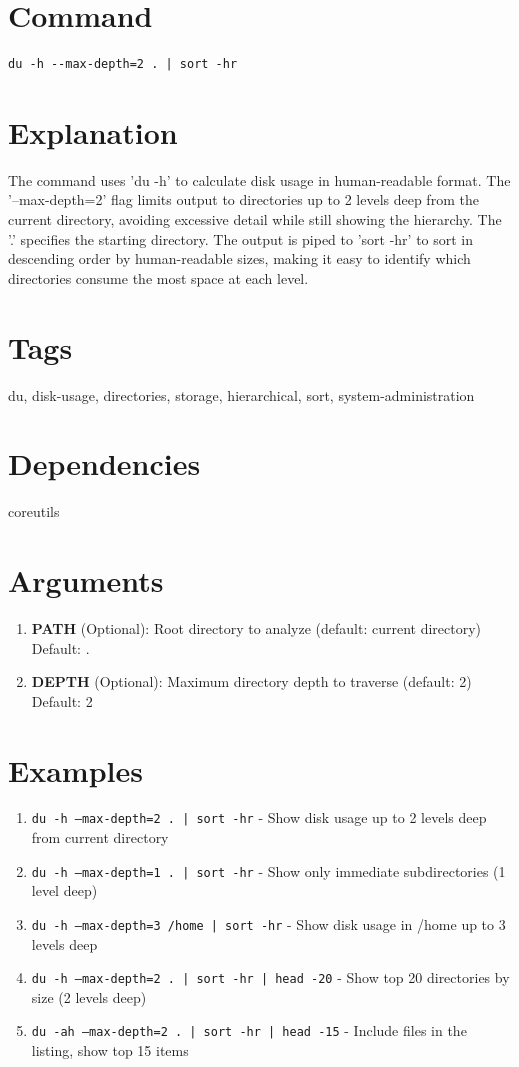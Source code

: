 \documentclass[openany]{book}
\begin{document}
\section*{Command}
\begin{lstlisting}
du -h --max-depth=2 . | sort -hr
\end{lstlisting}

\section*{Explanation}
The command uses 'du -h' to calculate disk usage in human-readable format. The '--max-depth=2' flag limits output to directories up to 2 levels deep from the current directory, avoiding excessive detail while still showing the hierarchy. The '.' specifies the starting directory. The output is piped to 'sort -hr' to sort in descending order by human-readable sizes, making it easy to identify which directories consume the most space at each level.

\section*{Tags}
du, disk-usage, directories, storage, hierarchical, sort, system-administration

\section*{Dependencies}
coreutils


\section*{Arguments}
\begin{enumerate}
  \item \textbf{PATH} (Optional): Root directory to analyze (default: current directory) \\ Default: .
  \item \textbf{DEPTH} (Optional): Maximum directory depth to traverse (default: 2) \\ Default: 2
\end{enumerate}

\section*{Examples}
\begin{enumerate}
  \item \texttt{du -h --max-depth=2 . | sort -hr} - Show disk usage up to 2 levels deep from current directory
  \item \texttt{du -h --max-depth=1 . | sort -hr} - Show only immediate subdirectories (1 level deep)
  \item \texttt{du -h --max-depth=3 /home | sort -hr} - Show disk usage in /home up to 3 levels deep
  \item \texttt{du -h --max-depth=2 . | sort -hr | head -20} - Show top 20 directories by size (2 levels deep)
  \item \texttt{du -ah --max-depth=2 . | sort -hr | head -15} - Include files in the listing, show top 15 items
\end{enumerate}
\end{document}
